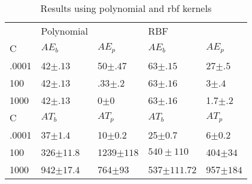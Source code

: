 \documentclass{acm_proc_article-sp}
\begin{document}
\begin{table}[htdp]
\centering
\caption{Results using polynomial and rbf kernels}
\begin{tabular}{|l|ll|ll|}
\hline
&Polynomial&&RBF&\\
\cline{2-5}
C&$AE_{b}$ & $AE_{p}$&$AE_{b}$&$AE_{p}$\\
\hline
.0001&42$\pm.13$&50$\pm.47$&63$\pm.15$&27$\pm.5$\\
100&42$\pm.13$&.33$\pm.2$&63$\pm.16$&3$\pm.4$\\
1000&42$\pm.13$&0$\pm0$&63$\pm.16$&1.7$\pm.2$\\
\hline
C&$AT_{b}$ & $AT_{p}$ &$AT_{b}$ & $AT_{p}$ \\
 \hline
.0001&37$\pm1.4$&10$\pm0.2$&25$\pm0.7$&6$\pm0.2$\\
100&326$\pm11.8$&1239$\pm118$&$540\pm110$&404$\pm34$\\
1000&942$\pm17.4$&764$\pm93$&537$\pm111.72$&957$\pm184$\\
\hline
\end{tabular}
\label{table: kernels}
\end{table}


\end{document}
